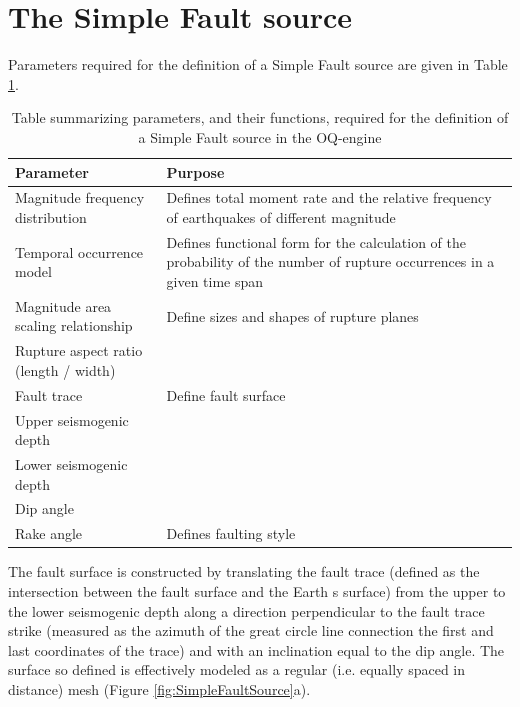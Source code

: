 \section{The Simple Fault source}
Parameters required for the definition of a Simple Fault source are given in
Table \ref{table:simple_fault_tab}.
\begin{table}
\centering
\caption{Table summarizing parameters, and their functions, required for the
definition of a Simple Fault source in the OQ-engine}
\begin{tabular}{|p{60mm} p{60mm}|}
\hline
\rowcolor{anti-flashwhite}
\bf{Parameter} & \bf{Purpose} \\ \hline
Magnitude frequency distribution & Defines total moment rate and the relative
frequency of earthquakes of different magnitude\\
\hline
Temporal occurrence model & Defines functional form for the calculation of
the probability of the number of rupture occurrences in a given time span\\ 
\hline
Magnitude area scaling relationship & Define sizes and shapes of rupture planes \\
Rupture aspect ratio (length / width) & \\
\hline
Fault trace & Define fault surface \\
Upper seismogenic depth & \\
Lower seismogenic depth & \\
Dip angle & \\
\hline
Rake angle & Defines faulting style \\
\hline %
\end{tabular}
\label{table:simple_fault_tab}
\end{table}
The fault surface is constructed by translating the fault trace (defined as the
intersection between the fault surface and the Earth s surface) from the upper
to the lower seismogenic depth along a direction perpendicular to the fault
trace strike (measured as the azimuth of the great circle line connection the first and last
coordinates of the trace) and with an inclination equal to the dip angle. The
surface so defined is effectively modeled as a regular (i.e. equally spaced in
distance) mesh (Figure \ref{fig:SimpleFaultSource}a).
